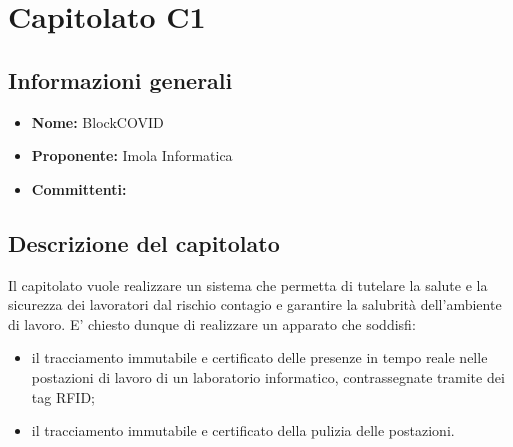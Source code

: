 \section{Capitolato C1}

\subsection{Informazioni generali}
\begin{itemize}
\item \textbf{Nome:} BlockCOVID
\item \textbf{Proponente:} Imola Informatica
\item \textbf{Committenti:} \committenti{}
\end{itemize}

\subsection{Descrizione del capitolato}
Il capitolato vuole realizzare un sistema che permetta di tutelare la salute e la sicurezza dei lavoratori dal rischio contagio e garantire la salubrità dell'ambiente di lavoro. E' chiesto dunque di realizzare un apparato che soddisfi:
\begin{itemize}
\item il tracciamento immutabile e certificato delle presenze in tempo reale nelle postazioni di lavoro di un laboratorio informatico, contrassegnate tramite dei tag RFID;
\item il tracciamento immutabile e certificato della pulizia delle postazioni.
\end{itemize}
